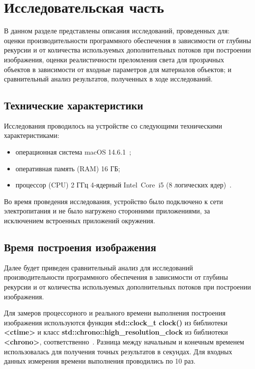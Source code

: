 \section{Исследовательская часть}

В данном разделе представлены описания исследований, проведенных для: оценки производительности программного обеспечения в зависимости от глубины рекурсии и от количества используемых дополнительных потоков при построении изображения, оценки реалистичности преломления света для прозрачных объектов в зависимости от входные параметров для материалов объектов; и сравнительный анализ результатов, полученных в ходе исследований.

\subsection{Технические характеристики}

Исследования проводилось на устройстве со следующими техническими характеристиками:

\begin{itemize}[label=---]
	\item операционная система macOS 14.6.1~\cite{macos};
	
	\item оперативная память (RAM) 16 ГБ;
	
	\item процессор (CPU) 2 ГГц 4‑ядерный Intel Core i5 (8 логических ядер)~\cite{intel}.
	
\end{itemize}

Во время проведения исследования, устройство было подключено к сети электропитания и не было нагружено сторонними приложениями, за исключением встроенных приложений окружения.

\subsection{Время построения изображения}

Далее будет приведен сравнительный анализ для исследований производительности программного обеспечения в зависимости от глубины рекурсии и от количества используемых дополнительных потоков при построении изображения.

Для замеров процессорного и реального времени выполнения построения изображения используются функция \textbf{std::clock\_t clock()} из библиотеки \textbf{<ctime>} и класс \textbf{std::chrono::high\_resolution\_clock} из библиотеки \textbf{<chrono>}, соответственно~\cite{ISO14882_2020}. Разница между начальным и конечным временем использовалась для получения точных результатов в секундах. Для входных данных измерения времени выполнения проводились по 10 раз. 


